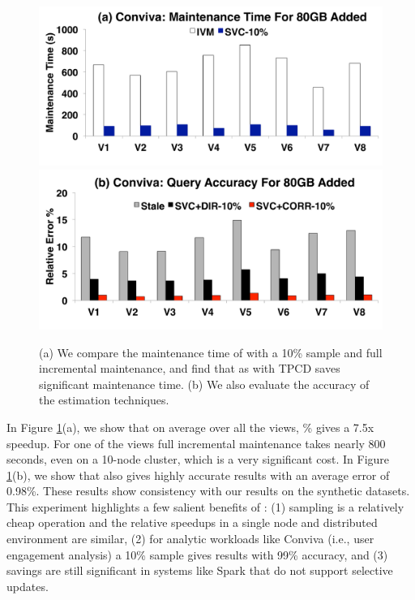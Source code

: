 \begin{figure}[t]
\centering
 \includegraphics[scale=0.16]{figs/con_3.pdf}
 \includegraphics[scale=0.16]{figs/con_4.pdf} \vspace{-1.5em}
 \caption{(a) We compare the maintenance time of \svc with a 10\% sample and full incremental maintenance, and find that as with TPCD \svc saves significant maintenance time. (b) We also evaluate the accuracy of the estimation techniques. \label{conv-1}}\vspace{-1.5em}
\end{figure}

In Figure \ref{conv-1}(a), we show that on average over all the views, \% gives a 7.5x speedup.
For one of the views full incremental maintenance takes nearly 800 seconds, even on a 10-node cluster, which is a very significant cost.
In Figure \ref{conv-1}(b), we show that \svc also gives highly accurate results with an average error of 0.98\%.
These results show consistency with our results on the synthetic datasets.
This experiment highlights a few salient benefits of \svc: (1) sampling is a relatively cheap operation and the relative speedups in a single node and distributed environment are similar, (2) for analytic workloads like Conviva (i.e., user engagement analysis) a 10\% sample gives results with 99\% accuracy, and (3) savings are still significant in systems like Spark that do not support selective updates.

